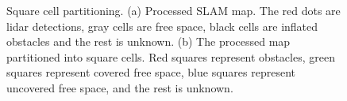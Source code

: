 \begin{figure}[h!]
    \centering
	\caption[Square cell partitioning.]{Square cell partitioning. (a) Processed SLAM map. The red dots are lidar detections, gray cells are free space, black cells are inflated obstacles and the rest is unknown. (b) The processed map partitioned into square cells. Red squares represent obstacles, green squares represent covered free space, blue squares represent uncovered free space, and the rest is unknown.} \label{fig:square_partition}
\end{figure}

